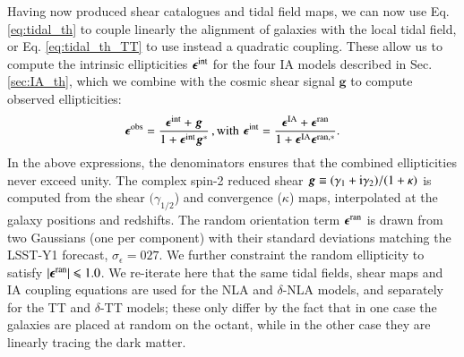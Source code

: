 \documentclass[useAMS,usenatbib]{mn2e}
\begin{document}
Having now produced shear catalogues and tidal field maps, we can now use Eq. \ref{eq:tidal_th} to couple linearly the alignment of galaxies with the local tidal field, or Eq. \ref{eq:tidal_th_TT} to use instead a quadratic coupling. These allow us to compute the intrinsic ellipticities ${\boldsymbol \epsilon}^{\rm int}$ for the four IA models described in Sec. \ref{sec:IA_th}, which we combine with the cosmic shear signal ${\boldsymbol g}$ to compute observed ellipticities: 
\begin{eqnarray}
{\boldsymbol \epsilon}^{\rm obs} = \frac{{\boldsymbol \epsilon}^{\rm int} + {\boldsymbol g}}{1 + {\boldsymbol \epsilon}^{\rm int}{\boldsymbol g^*}} \,, {\rm with \, \, } 
{\boldsymbol \epsilon}^{\rm int}  = \frac{{\boldsymbol \epsilon}^{\rm IA} + {\boldsymbol \epsilon}^{\rm ran}}{1 + {\boldsymbol \epsilon}^{\rm IA}{\boldsymbol \epsilon^{\rm ran, *}}}.
\label{eq:eps_obs}
\end{eqnarray}
In the above expressions, the denominators ensures that the combined  ellipticities never exceed unity.
The complex spin-2 reduced shear ${\boldsymbol g} \equiv (\gamma_1 + {\rm i} \gamma_2)/(1+\kappa)$ is computed from the shear  $(\gamma_{1/2}$) and convergence ($\kappa$) maps, interpolated at the galaxy positions and redshifts. The  random orientation term ${\boldsymbol \epsilon}^{\rm ran}$ is drawn from two Gaussians (one per component) with their standard deviations matching the LSST-Y1 forecast, $\sigma_{\epsilon} = 027$. We further constraint  the random ellipticity to satisfy $|{\boldsymbol \epsilon}^{\rm ran}| \le 1.0$. 
We re-iterate here that the same tidal fields, shear maps and IA coupling equations are used for the NLA and $\delta$-NLA models, and separately for the TT and $\delta$-TT models; these  only differ by the fact that in one case the galaxies are placed at random on the octant, while in the other case they are linearly tracing the dark matter.
\end{document}
